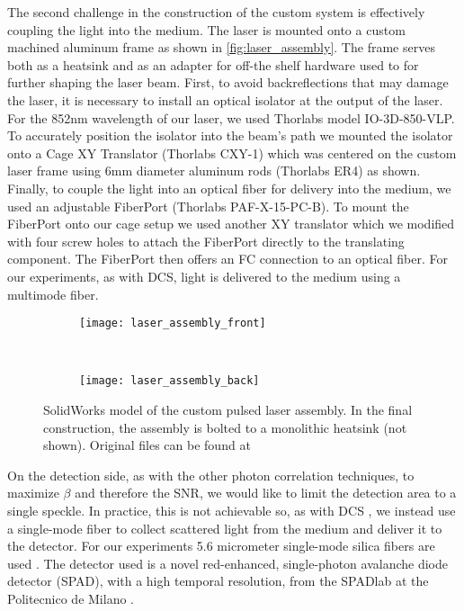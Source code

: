 The second challenge in the construction of the custom system is effectively coupling the light into the medium. The laser is mounted onto a custom machined aluminum frame as shown in \autoref{fig:laser_assembly}. The frame serves both as a heatsink and as an adapter for off-the shelf hardware used to for further shaping the laser beam. First, to avoid backreflections that may damage the laser, it is necessary to install an optical isolator at the output of the laser. For the 852nm wavelength of our laser, we used Thorlabs model IO-3D-850-VLP. To accurately position the isolator into the beam's path we mounted the isolator onto a Cage XY Translator (Thorlabs CXY-1) which was centered on the custom laser frame using 6mm diameter aluminum rods (Thorlabs ER4) as shown. Finally, to couple the light into an optical fiber for delivery into the medium, we used an adjustable FiberPort (Thorlabs PAF-X-15-PC-B). To mount the FiberPort onto our cage setup we used another XY translator which we modified with four screw holes to attach the FiberPort directly to the translating component. The FiberPort then offers an FC connection to an optical fiber. For our experiments, as with DCS, light is delivered to the medium using a multimode fiber. %

\begin{figure}[tb]
    \begin{subfigure}{0.5\textwidth}
        \centering
        \texttt{[image: laser\_assembly\_front]}
    \end{subfigure}~%
    \begin{subfigure}{0.5\textwidth}
        \centering
        \texttt{[image: laser\_assembly\_back]}
    \end{subfigure}
    \caption{SolidWorks model of the custom pulsed laser assembly. In the final construction, the assembly is bolted to a monolithic heatsink (not shown). Original files can be found at \coderepolink}
    \label{fig:laser_assembly}
\end{figure}

On the detection side, as with the other photon correlation techniques, to maximize $\beta$ and therefore the SNR, we would like to limit the detection area to a single speckle. In practice, this is not achievable so, as with DCS \cite[Section 6.2]{Boas1996thesis}, we instead use a single-mode fiber to collect scattered light from the medium and deliver it to the detector. For our experiments 5.6 micrometer single-mode silica fibers are used . The detector used is a novel red-enhanced, single-photon avalanche diode detector (SPAD), with a high temporal resolution, from the SPADlab at the Politecnico de Milano \cite{Gulinatti2012,Giudice2012}. 

